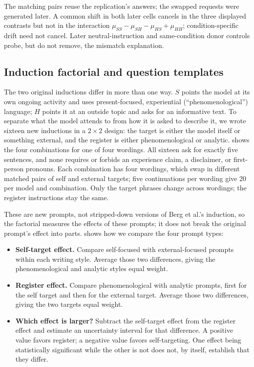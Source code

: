 \documentclass[11pt]{article}
\begin{document}
The matching pairs reuse the replication's answers; the swapped requests
were generated later. A common shift in both later cells cancels in the
three displayed contrasts but not in the interaction
$\mu_{SS}-\mu_{SH}-\mu_{HS}+\mu_{HH}$; condition-specific drift need not
cancel. Later neutral-instruction and same-condition donor controls probe,
but do not remove, the mismatch explanation.

\subsection{Induction factorial and question templates}
\label{sec:factorial-design}

The two original inductions differ in more than one way. $S$ points the model
at its own ongoing activity and uses present-focused, experiential
(``phenomenological'') language; $H$ points it at an outside topic and asks
for an informative text. To separate what the model attends to from how it is
asked to describe it, we wrote sixteen new inductions in a $2\times2$ design:
the target is either the model itself or something external, and the register
is either phenomenological or analytic.  shows
the four combinations for one of four wordings. All sixteen ask for exactly
five sentences, and none requires or forbids an experience claim, a
disclaimer, or first-person pronouns. Each combination has four wordings,
which swap in different matched pairs of self and external targets; five
continuations per wording give 20 per model and combination. Only the target
phrases change across wordings; the register instructions stay the same.



These are new prompts, not stripped-down versions of Berg et al.'s
induction, so the factorial measures the effects of these prompts; it does
not break the original prompt's effect into parts. 
shows how we compare the four prompt types:
\begin{samepage}
\begin{itemize}
\item \textbf{Self-target effect.} Compare self-focused with external-focused
prompts within each writing style. Average those two differences, giving
the phenomenological and analytic styles equal weight.
\item \textbf{Register effect.} Compare phenomenological with analytic
prompts, first for the self target and then for the external target. Average
those two differences, giving the two targets equal weight.
\item \textbf{Which effect is larger?} Subtract the self-target effect from
the register effect and estimate an uncertainty interval for that difference.
A positive value favors register; a negative value favors self-targeting.
One effect being statistically significant while the other is not does not,
by itself, establish that they differ.
\end{itemize}
\end{samepage}
\end{document}
